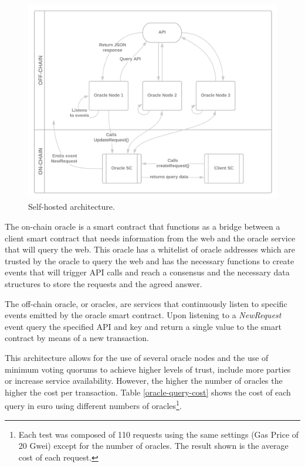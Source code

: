\begin{figure}[t]
    \begin{center}
        \leavevmode
        \includegraphics[width=1\textwidth]{figures/self-hosted-architecture.png}
        \caption{Self-hosted architecture.}
        \label{fig:/figures/self-hosted-architecture}
    \end{center}
\end{figure}


The on-chain oracle is a smart contract that functions as a bridge between a client smart contract that needs information from the web and the oracle service that will query the web. This oracle has a whitelist of oracle addresses which are trusted by the oracle to query the web and has the necessary functions to create events that will trigger API calls and reach a consensus and the necessary data structures to store the requests and the agreed answer.

The off-chain oracle, or oracles, are services that continuously listen to specific events emitted by the oracle smart contract. Upon listening to a \textit{NewRequest} event query the specified API and key and return a single value to the smart contract by means of a new transaction.

This architecture allows for the use of several oracle nodes and the use of minimum voting quorums to achieve higher levels of trust, include more parties or increase service availability. However, the higher the number of oracles the higher the cost per transaction. Table \ref{oracle-query-cost} shows the cost of each query in euro using different numbers of oracles\footnote{Each test was composed of 110 requests using the same settings (Gas Price of 20 Gwei) except for the number of oracles. The result shown is the average cost of each request.}.


